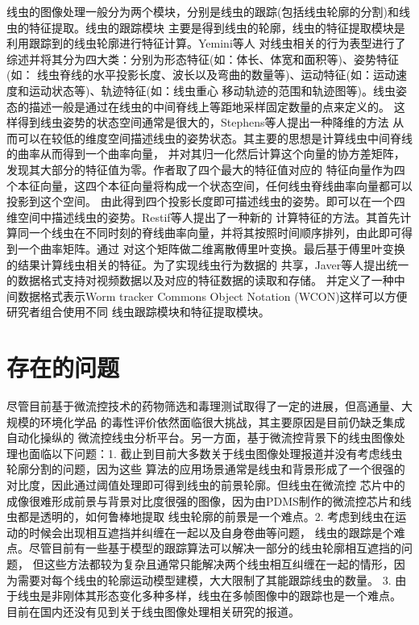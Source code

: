 	线虫的图像处理一般分为两个模块，分别是线虫的跟踪(包括线虫轮廓的分割)和线虫的特征提取。线虫的跟踪模块
	主要是得到线虫的轮廓，线虫的特征提取模块是利用跟踪到的线虫轮廓进行特征计算。Yemini等人\cite{yemini2013database}
	对线虫相关的行为表型进行了综述并将其分为四大类：分别为形态特征(如：体长、体宽和面积等)、姿势特征(如：
	线虫脊线的水平投影长度、波长以及弯曲的数量等)、运动特征(如：运动速度和运动状态等)、轨迹特征(如：线虫重心
	移动轨迹的范围和轨迹图等)。线虫姿态的描述一般是通过在线虫的中间脊线上等距地采样固定数量的点来定义的。
	这样得到线虫姿势的状态空间通常是很大的，Stephens等人\cite{Stephens2008Dimensionality}提出一种降维的方法
	从而可以在较低的维度空间描述线虫的姿势状态。其主要的思想是计算线虫中间脊线的曲率从而得到一个曲率向量，
	并对其归一化然后计算这个向量的协方差矩阵，发现其大部分的特征值为零。作者取了四个最大的特征值对应的
	特征向量作为四个本征向量，这四个本征向量将构成一个状态空间，任何线虫脊线曲率向量都可以投影到这个空间。
	由此得到四个投影长度即可描述线虫的姿势。即可以在一个四维空间中描述线虫的姿势。Restif等人\cite{Restif2014CeleST}提出了一种新的
	计算特征的方法。其首先计算同一个线虫在不同时刻的脊线曲率向量，并将其按照时间顺序排列，由此即可得到一个曲率矩阵。通过
	对这个矩阵做二维离散傅里叶变换。最后基于傅里叶变换的结果计算线虫相关的特征。为了实现线虫行为数据的
	共享，Javer等人\cite{Javer2018An}提出统一的数据格式支持对视频数据以及对应的特征数据的读取和存储。
	并定义了一种中间数据格式表示Worm tracker Commons Object Notation (WCON)这样可以方便研究者组合使用不同
	线虫跟踪模块和特征提取模块。
\section{存在的问题}
\label{sec:intro:analog}
	 尽管目前基于微流控技术的药物筛选和毒理测试取得了一定的进展，但高通量、大规模的环境化学品
	 的毒性评价依然面临很大挑战，其主要原因是目前仍缺乏集成自动化操纵的
	 微流控线虫分析平台。另一方面，基于微流控背景下的线虫图像处理也面临以下问题：1. 截止到目前大多数关于线虫图像处理报道并没有考虑线虫轮廓分割的问题，因为这些
算法的应用场景通常是线虫和背景形成了一个很强的对比度，因此通过阈值处理即可得到线虫的前景轮廓。但线虫在微流控
芯片中的成像很难形成前景与背景对比度很强的图像，因为由PDMS制作的微流控芯片和线虫都是透明的，如何鲁棒地提取
线虫轮廓的前景是一个难点。2. 考虑到线虫在运动的时候会出现相互遮挡并纠缠在一起以及自身卷曲等问题，
线虫的跟踪是个难点。尽管目前有一些基于模型的跟踪算法可以解决一部分的线虫轮廓相互遮挡的问题，
但这些方法都较为复杂且通常只能解决两个线虫相互纠缠在一起的情形，因为需要对每个线虫的轮廓运动模型建模，大大限制了其能跟踪线虫的数量。
3. 由于线虫是非刚体其形态变化多种多样，线虫在多帧图像中的跟踪也是一个难点。
目前在国内还没有见到关于线虫图像处理相关研究的报道。

